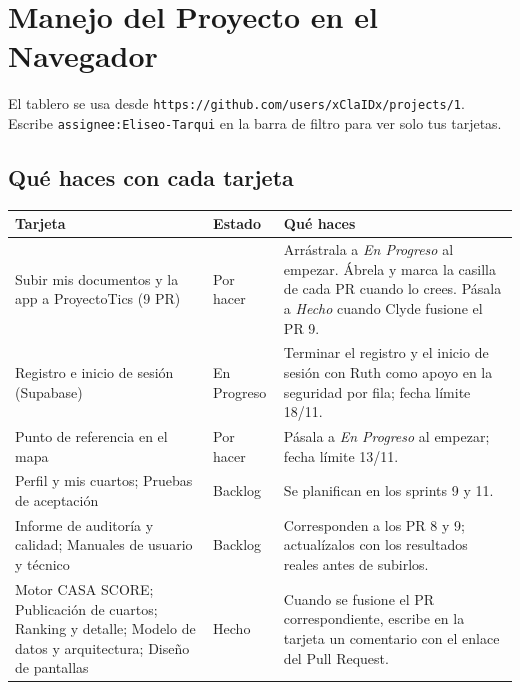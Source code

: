 \documentclass[11pt,a4paper]{article}
\begin{document}
\section{Manejo del Proyecto en el Navegador}
El tablero se usa desde \nolinkurl{https://github.com/users/xClaIDx/projects/1}. Escribe \nolinkurl{assignee:Eliseo-Tarqui} en la barra de filtro para ver solo tus tarjetas.

\subsection{Qué haces con cada tarjeta}
{\small
{}
\noindent\begin{tabularx}{\textwidth}{@{}P{4.4cm} C{1.9cm} L@{}}
\toprule
{}
\textbf{Tarjeta} & \textbf{Estado} & \textbf{Qué haces} \\
\midrule
Subir mis documentos y la app a ProyectoTics (9 PR) & Por hacer & Arrástrala a \textit{En Progreso} al empezar. Ábrela y marca la casilla de cada PR cuando lo crees. Pásala a \textit{Hecho} cuando Clyde fusione el PR 9. \\
Registro e inicio de sesión (Supabase) & En Progreso & Terminar el registro y el inicio de sesión con Ruth como apoyo en la seguridad por fila; fecha límite 18/11. \\
Punto de referencia en el mapa & Por hacer & Pásala a \textit{En Progreso} al empezar; fecha límite 13/11. \\
Perfil y mis cuartos; Pruebas de aceptación & Backlog & Se planifican en los sprints 9 y 11. \\
Informe de auditoría y calidad; Manuales de usuario y técnico & Backlog & Corresponden a los PR 8 y 9; actualízalos con los resultados reales antes de subirlos. \\
Motor CASA SCORE; Publicación de cuartos; Ranking y detalle; Modelo de datos y arquitectura; Diseño de pantallas & Hecho & Cuando se fusione el PR correspondiente, escribe en la tarjeta un comentario con el enlace del Pull Request. \\
\bottomrule
\end{tabularx}
}


\end{document}
